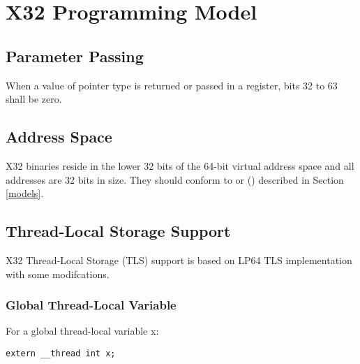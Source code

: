 \chapter{X32 Programming Model\label{x32}}

\section{Parameter Passing}
When a value of pointer type is returned or passed in a register, bits 32
to 63 shall be zero.

\section{Address Space}

\xARCH X32 binaries reside in the lower 32 bits of the 64-bit virtual
address space and all addresses are 32 bits in size.  They should conform
to  or
 ()
described in Section \ref{models}.

\section{Thread-Local Storage Support}

X32 Thread-Local Storage (TLS) support is based on LP64 TLS
implementation with some modifcations.

\subsection{Global Thread-Local Variable}

For a global thread-local variable x:

\begin{verbatim}
extern __thread int x;
\end{verbatim}

